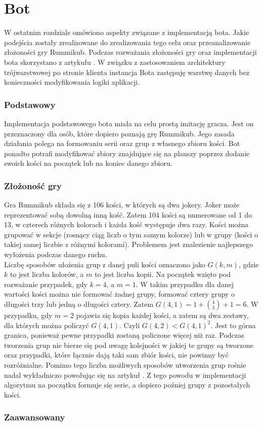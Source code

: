 \chapter{Bot}
\thispagestyle{chapterBeginStyle}

W ostatnim rozdziale omówiono aspekty związane z implementacją bota. Jakie podejścia zostały zrealizowane do zrealizowania tego celu oraz przeanalizowanie złożoności gry Rummikub. Podczas rozważania złożoności gry oraz implementacji bota skorzystano z artykułu \cite{RummikubComplexity}. W związku z zastosowaniem architektury trójwarstwowej po stronie klienta instancja Bota zastępuję warstwę danych bez konieczności modyfikowania logiki aplikacji.

\subsection{Podstawowy}

Implementacja podstawowego bota miała na celu prostą imitację gracza. Jest on przeznaczony dla osób, które dopiero poznają grę Rummikub. Jego zasada działania polega na formowaniu serii oraz grup z własnego zbioru kości. Bot ponadto potrafi modyfikować zbiory znajdujące się na planszy poprzez dodanie swoich kości na początek lub na koniec danego zbioru.

\subsection{Złożoność gry}

Gra Rummikub składa się z 106 kości, w których są dwa jokery. Joker może reprezentować sobą dowolną inną kość. Zatem 104 kości są numerowane od 1 do 13, w czterech różnych kolorach i każda kość występuje dwa razy. Kości można grupować w sekcje (rosnący ciąg liczb o tym samym kolorze) lub w grupy (kości o takiej samej liczbie z różnymi kolorami). Problemem jest znalezienie najlepszego wyłożenia podczas danego ruchu. \\

 Liczbę sposobów ułożenia grup z danej puli kości oznaczono jako $G(k, m)$, gdzie $k$ to jest liczba kolorów, a $m$ to jest liczba kopii. Na początek wzięto pod rozważanie przypadek, gdy $k = 4$, a $m = 1$. W takim przypadku dla danej wartości kości można nie formować żadnej grupy, formować cztery grupy o długości trzy lub jedną o długości cztery. Zatem $G(4,1) = 1 + {{4}\choose{3}} + 1 = 6$. W przypadku, gdy $m = 2$ pojawia się kopia każdej kości, a zatem są dwa zestawy, dla których można policzyć $G(4,1)$. Czyli $G(4,2) < G(4,1)^2$. Jest to górna granica, ponieważ pewne przypadki zostaną policzone więcej niż raz. Podczas tworzenia grup nie bierze się pod uwagę kolejności w jakiej te grupy są tworzone oraz przypadki, które łącznie dają taki sam zbiór kości, nie powinny być rozróżnialne. Pomimo tego liczba możliwych sposobów utworzenia grup rośnie nadal wykładniczo powołując się na artykuł \cite{RummikubComplexity}. Z tego powodu w implementacji algorytmu na początku formuje się serie, a dopiero poźniej grupy z pozostałych kości.
 

\subsection{Zaawansowany}



